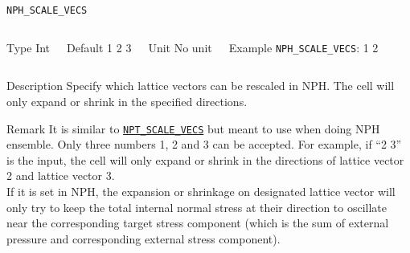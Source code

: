 \begin{frame}[allowframebreaks]{\texttt{NPH\_SCALE\_VECS}} \label{NPH_SCALE_VECS}
\vspace*{-12pt}
\begin{columns}
\begin{block}{Type}
Int
\end{block}

\begin{block}{Default}
1 2 3
\end{block}

\begin{block}{Unit}
No unit
\end{block}

\begin{block}{Example}
\texttt{NPH\_SCALE\_VECS}: 1 2
\end{block}
\end{columns}

\begin{block}{Description}
Specify which lattice vectors can be rescaled in NPH. The cell will only expand or shrink in the specified directions.

\end{block}

\begin{block}{Remark}
It is similar to \hyperlink{NPT\_SCALE\_VECS}{\texttt{NPT\_SCALE\_VECS}} but meant to use when doing NPH ensemble. Only three numbers 1, 2 and 3 can be accepted. For example, if ``2 3'' is the input, the cell will only expand or shrink in the directions of lattice vector 2 and lattice vector 3.
\\
If it is set in NPH, the expansion or shrinkage on designated lattice vector will only try to keep the total internal normal stress at their direction to oscillate near the corresponding target stress component (which is the sum of external pressure and corresponding external stress component).
\end{block}

\end{frame}



